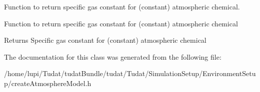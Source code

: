 Function to return specific gas constant for (constant) atmospheric chemical. 

Function to return specific gas constant for (constant) atmospheric chemical \begin{DoxyReturn}{Returns}
Specific gas constant for (constant) atmospheric chemical 
\end{DoxyReturn}


The documentation for this class was generated from the following file\+:\begin{DoxyCompactItemize}
\item 
/home/lupi/\+Tudat/tudat\+Bundle/tudat/\+Tudat/\+Simulation\+Setup/\+Environment\+Setup/create\+Atmosphere\+Model.\+h\end{DoxyCompactItemize}
